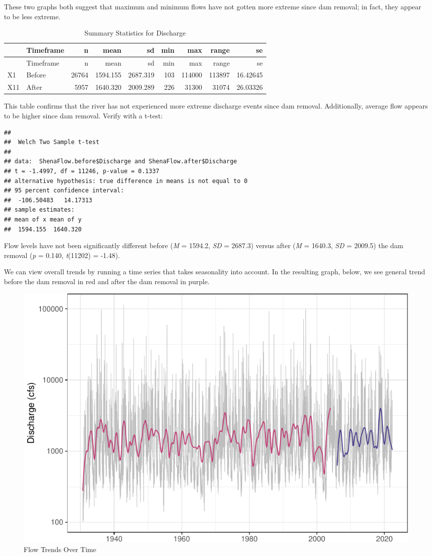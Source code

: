 \documentclass[
  12pt,
]{article}
\begin{document}
These two graphs both suggest that maximum and minimum flows have not
gotten more extreme since dam removal; in fact, they appear to be less
extreme.

\newpage

\begin{longtable}[]{@{}llrrrrrrr@{}}
\caption{Summary Statistics for Discharge}\tabularnewline
\toprule
& Timeframe & n & mean & sd & min & max & range & se \\
\midrule
\endfirsthead
\toprule
& Timeframe & n & mean & sd & min & max & range & se \\
\midrule
\endhead
X1 & Before & 26764 & 1594.155 & 2687.319 & 103 & 114000 & 113897 &
16.42645 \\
X11 & After & 5957 & 1640.320 & 2009.289 & 226 & 31300 & 31074 &
26.03326 \\
\bottomrule
\end{longtable}

This table confirms that the river has not experienced more extreme
discharge events since dam removal. Additionally, average flow appears
to be higher since dam removal. Verify with a t-test:

\begin{verbatim}
## 
##  Welch Two Sample t-test
## 
## data:  ShenaFlow.before$Discharge and ShenaFlow.after$Discharge
## t = -1.4997, df = 11246, p-value = 0.1337
## alternative hypothesis: true difference in means is not equal to 0
## 95 percent confidence interval:
##  -106.50483   14.17313
## sample estimates:
## mean of x mean of y 
##  1594.155  1640.320
\end{verbatim}

Flow levels have not been significantly different before (\emph{M} =
1594.2, \emph{SD} = 2687.3) versus after (\emph{M} = 1640.3, \emph{SD} =
2009.5) the dam removal (\emph{p} = 0.140, \emph{t}(11202) = -1.48).

\newpage

We can view overall trends by running a time series that takes
seasonality into account. In the resulting graph, below, we see general
trend before the dam removal in red and after the dam removal in purple.

\begin{figure}
\centering
\includegraphics{Project_Script_files/figure-latex/flow_ts_graph-1.pdf}
\caption{Flow Trends Over Time}
\end{figure}
\end{document}
